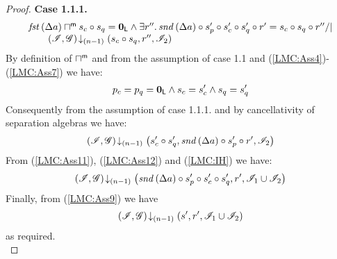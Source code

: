 \begin{lemma}
\begin{proof}
\noindent\textbf{Case 1.1.1.} 
\[
\begin{array}{l}
	\fst{\updateFP{a}} \maxMeetL s_c \composeL s_q  = \unitL \land  \exsts{r''} \snd{\updateFP{a}} \composeL s_p' \composeL s_c' \composeL s_q' \composeL r' = s_c \composeL s_q \composeL r'' /| \null \\
	\qquad\extendsAMUpto{\lmod, \gmod}{(n-1)}{s_c \composeL s_q}{r''}{\lmod_2}
\end{array}
\]
By definition of $\sqcap_{}^{\textsf{m}}$ and from the assumption of case 1.1 and (\ref{LMC:Ass4})-(\ref{LMC:Ass7}) we have:
%
\begin{align*}
	p_c = p_q = \mathbf{0}_{\textsf{L}} \land s_c = s_c' \land s_q = s_q'
\end{align*}
%
Consequently from the assumption of case 1.1.1. and by cancellativity of separation algebras we have:
\begin{align}
	\left(\mathscr{I}, \mathscr{G}\right) \!\downarrow_{(n-1)} \left(s_c' \circ s_q', \mathit{snd}\left(\Delta {a}\right) \circ s_p' \circ r', \mathscr{I}_2\right) \label{LMC:Ass12}
\end{align}
%
From (\ref{LMC:Ass11}), (\ref{LMC:Ass12}) and (\ref{LMC:IH}) we have:
%
\begin{align*}
	\left(\mathscr{I}, \mathscr{G}\right) \!\downarrow_{(n-1)} \left(\mathit{snd}\left(\Delta {a}\right) \circ s_p' \circ s_c' \circ s_q' , r', \mathscr{I}_1 \cup \mathscr{I}_2\right)
\end{align*}
Finally, from (\ref{LMC:Ass9}) we have
%
\begin{align*}
	\left(\mathscr{I}, \mathscr{G}\right) \!\downarrow_{(n-1)} \left(s', r', \mathscr{I}_1 \cup \mathscr{I}_2\right)
\end{align*}
%
as required.\\
%
%
%
%
%


\end{proof}
\end{lemma}
